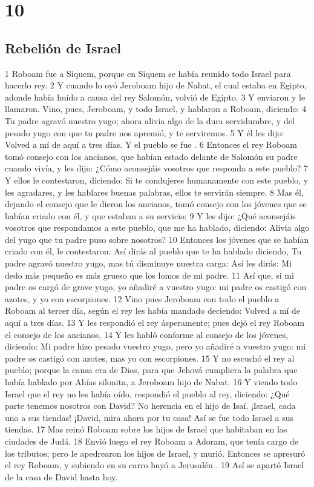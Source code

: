 \chapter{10}

\section*{Rebelión de Israel}

 

1 Roboam fue a Siquem, porque en Siquem se había reunido todo Israel para hacerlo rey.
2 Y cuando lo oyó Jeroboam hijo de Nabat, el cual estaba en Egipto, adonde había huído a causa del rey Salomón, volvió de Egipto. 
3 Y enviaron y le llamaron. Vino, pues, Jeroboam, y todo Israel, y hablaron a Roboam, diciendo:
4 Tu padre agravó nuestro yugo; ahora alivia algo de la dura servidumbre, y del pesado yugo con que tu padre nos apremió, y te serviremos.
5 Y él les dijo: Volved a mí de aquí a tres días. Y el pueblo se fue .
6 Entonces el rey Roboam tomó consejo con los ancianos, que habían estado delante de Salomón su padre cuando vivía, y les dijo: ¿Cómo aconsejáis vosotros que responda a este pueblo?
7 Y ellos le contestaron, diciendo: Si te condujeres humanamente con este pueblo, y les agradares, y les hablares buenas palabras, ellos te servirán siempre.
8 Mas él, dejando el consejo que le dieron los ancianos, tomó consejo con los jóvenes que se habían criado con él, y que estaban a su servicio;
9 Y les dijo: ¿Qué aconsejáis vosotros que respondamos a este pueblo, que me ha hablado, diciendo: Alivia algo del yugo que tu padre puso sobre nosotros?
10 Entonces los jóvenes que se habían criado con él, le contestaron: Así dirás al pueblo que te ha hablado diciendo, Tu padre agravó nuestro yugo, mas tú disminuye nuestra carga: Así les dirás: Mi dedo más pequeño es más grueso que los lomos de mi padre.
11 Así que, si mi padre os cargó de grave yugo,  yo añadiré a vuestro yugo: mi padre os castigó con azotes, y yo con escorpiones.
12 Vino pues Jeroboam con todo el pueblo a Roboam al tercer día, según el rey les había mandado deciendo: Volved a mí de aquí a tres días.
13 Y les respondió el rey ásperamente; pues dejó el rey Roboam el consejo de los ancianos,
14 Y les habló conforme al consejo de los jóvenes, diciendo: Mi padre hizo pesado vuestro yugo, pero yo añadiré a vuestro yugo: mi padre os castigó con azotes, mas yo con escorpiones.
15 Y no escuchó el rey al pueblo; porque la causa era de Dios, para que Jehová cumpliera la palabra que había hablado por Ahías silonita, a Jeroboam hijo de Nabat.
16 Y viendo todo Israel que el rey no les había oído, respondió el pueblo al rey, diciendo: ¿Qué parte tenemos nosotros con David? No herencia en el hijo de Isaí. ¡Israel, cada uno a sus tiendas! ¡David, mira ahora por tu casa! Así se fue todo Israel a sus tiendas.
17 Mas reinó Roboam sobre los hijos de Israel que habitaban en las ciudades de Judá.
18 Envió luego el rey Roboam a Adoram, que tenía cargo de los tributos; pero le apedrearon los hijos de Israel, y murió. Entonces se apresuró el rey Roboam, y subiendo en su carro huyó a Jerusalén .
19 Así se apartó Israel de la casa de David hasta hoy.

